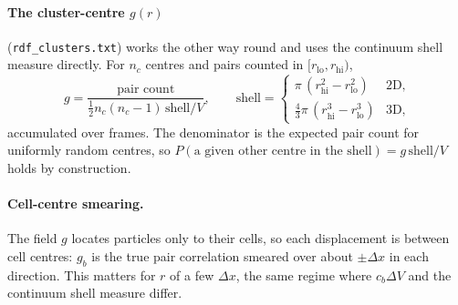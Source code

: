 \documentclass[11pt]{article}
\newcommand{\code}[1]{\texttt{#1}}
\begin{document}
\paragraph{The cluster-centre $g(r)$} (\code{rdf\_clusters.txt}) works the
other way round and uses the continuum shell measure directly. For $n_c$
centres and pairs counted in $[r_{\mathrm{lo}},r_{\mathrm{hi}})$,
\begin{equation}
  g = \frac{\text{pair count}}{\frac12n_c(n_c-1)\,\text{shell}/V},\qquad
  \text{shell}=\begin{cases}
    \pi\,(r_{\mathrm{hi}}^2-r_{\mathrm{lo}}^2) & \text{2D},\\[2pt]
    \frac43\pi\,(r_{\mathrm{hi}}^3-r_{\mathrm{lo}}^3) & \text{3D},
  \end{cases}
\end{equation}
accumulated over frames. The denominator is the expected pair count for
uniformly random centres, so $P(\text{a given other centre in the shell})=
g\,\text{shell}/V$ holds by construction.

\paragraph{Cell-centre smearing.} The field $g$ locates particles only to
their cells, so each displacement is between cell centres: $g_b$ is the true
pair correlation smeared over about $\pm\Delta x$ in each direction. This
matters for $r$ of a few $\Delta x$, the same regime where $c_b\Delta V$ and
the continuum shell measure differ.
\end{document}
